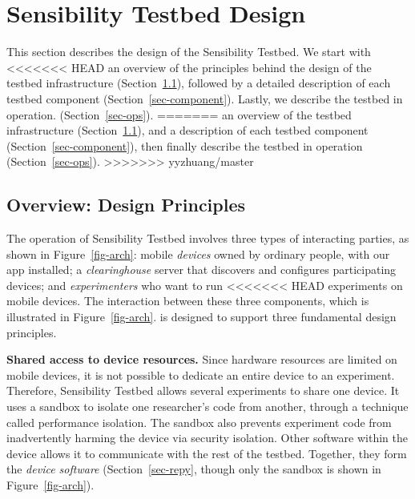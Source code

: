 \section{Sensibility Testbed Design}\label{sec-design}

This section describes the design of the Sensibility Testbed. 
We start with
<<<<<<< HEAD
an overview of the principles behind the design of the testbed infrastructure (Section~\ref{sec-overview}), 
followed by a detailed description of each testbed component 
(Section~\ref{sec-component}). Lastly, we describe the testbed in operation.
 (Section~\ref{sec-ops}).
=======
an overview of the testbed infrastructure (Section~\ref{sec-overview}), 
and a description of each testbed component 
(Section~\ref{sec-component}), then finally describe the testbed in 
operation (Section~\ref{sec-ops}).
>>>>>>> yyzhuang/master


\subsection{Overview: Design Principles}\label{sec-overview}

The operation of Sensibility Testbed  involves three types of interacting
parties, as shown in Figure~\ref{fig-arch}: mobile \textit{devices} 
owned by ordinary people, with our app installed; a 
\textit{clearinghouse} server that discovers and configures
participating devices; and \textit{experimenters} who want to run
<<<<<<< HEAD
experiments on mobile devices. The interaction between these three components, which is illustrated in Figure~\ref{fig-arch}. is designed to support three fundamental design principles.

\textbf{Shared access to device resources.} 
Since hardware resources are limited on mobile devices, it is 
not possible to dedicate an entire device to an experiment. Therefore, 
Sensibility Testbed allows several experiments to share one device. It uses a sandbox to isolate one researcher's code from 
 another, through a technique called performance isolation. The sandbox 
also prevents experiment code from inadvertently harming the device
via security isolation. Other software within the device allows
it to communicate with the rest of the testbed. Together, they form the
\textit{device software} (Section~\ref{sec-repy}, though only the 
sandbox is shown in Figure~\ref{fig-arch}).

